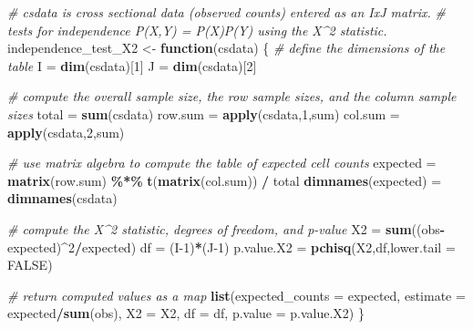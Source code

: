 \documentclass[
]{article}
\newenvironment{Shaded}{\begin{snugshade}}{\end{snugshade}}
\newcommand{\AttributeTok}[1]{\textcolor[rgb]{0.13,0.29,0.53}{#1}}
\newcommand{\CommentTok}[1]{\textcolor[rgb]{0.56,0.35,0.01}{\textit{#1}}}
\newcommand{\ConstantTok}[1]{\textcolor[rgb]{0.56,0.35,0.01}{#1}}
\newcommand{\ControlFlowTok}[1]{\textcolor[rgb]{0.13,0.29,0.53}{\textbf{#1}}}
\newcommand{\DecValTok}[1]{\textcolor[rgb]{0.00,0.00,0.81}{#1}}
\newcommand{\FunctionTok}[1]{\textcolor[rgb]{0.13,0.29,0.53}{\textbf{#1}}}
\newcommand{\NormalTok}[1]{#1}
\newcommand{\OtherTok}[1]{\textcolor[rgb]{0.56,0.35,0.01}{#1}}
\newcommand{\SpecialCharTok}[1]{\textcolor[rgb]{0.81,0.36,0.00}{\textbf{#1}}}
\begin{document}
\begin{Shaded}
\begin{Highlighting}[]
\CommentTok{\# csdata is cross sectional data (observed counts) entered as an IxJ matrix.}
\CommentTok{\# tests for independence P(X,Y) = P(X)P(Y) using the X\^{}2 statistic.}
\NormalTok{independence\_test\_X2 }\OtherTok{\textless{}{-}} \ControlFlowTok{function}\NormalTok{(csdata)}
\NormalTok{\{}
  \CommentTok{\# define the dimensions of the table}
\NormalTok{  I }\OtherTok{=} \FunctionTok{dim}\NormalTok{(csdata)[}\DecValTok{1}\NormalTok{]}
\NormalTok{  J }\OtherTok{=} \FunctionTok{dim}\NormalTok{(csdata)[}\DecValTok{2}\NormalTok{]}
  
  \CommentTok{\# compute the overall sample size, the row sample sizes, and the column sample sizes}
\NormalTok{  total }\OtherTok{=} \FunctionTok{sum}\NormalTok{(csdata)}
\NormalTok{  row.sum }\OtherTok{=} \FunctionTok{apply}\NormalTok{(csdata,}\DecValTok{1}\NormalTok{,sum)}
\NormalTok{  col.sum }\OtherTok{=} \FunctionTok{apply}\NormalTok{(csdata,}\DecValTok{2}\NormalTok{,sum)}
  
  \CommentTok{\# use matrix algebra to compute the table of expected cell counts}
\NormalTok{  expected }\OtherTok{=} \FunctionTok{matrix}\NormalTok{(row.sum) }\SpecialCharTok{\%*\%} \FunctionTok{t}\NormalTok{(}\FunctionTok{matrix}\NormalTok{(col.sum)) }\SpecialCharTok{/}\NormalTok{ total}
  \FunctionTok{dimnames}\NormalTok{(expected) }\OtherTok{=} \FunctionTok{dimnames}\NormalTok{(csdata)}
  
  \CommentTok{\# compute the X\^{}2 statistic, degrees of freedom, and p{-}value}
\NormalTok{  X2 }\OtherTok{=} \FunctionTok{sum}\NormalTok{((obs}\SpecialCharTok{{-}}\NormalTok{expected)}\SpecialCharTok{\^{}}\DecValTok{2}\SpecialCharTok{/}\NormalTok{expected)}
\NormalTok{  df }\OtherTok{=}\NormalTok{ (I}\DecValTok{{-}1}\NormalTok{)}\SpecialCharTok{*}\NormalTok{(J}\DecValTok{{-}1}\NormalTok{)}
\NormalTok{  p.value.X2 }\OtherTok{=} \FunctionTok{pchisq}\NormalTok{(X2,df,}\AttributeTok{lower.tail =} \ConstantTok{FALSE}\NormalTok{)}
  
  \CommentTok{\# return computed values as a map}
  \FunctionTok{list}\NormalTok{(}\AttributeTok{expected\_counts =}\NormalTok{ expected,}
       \AttributeTok{estimate =}\NormalTok{ expected}\SpecialCharTok{/}\FunctionTok{sum}\NormalTok{(obs),}
       \AttributeTok{X2 =}\NormalTok{ X2,}
       \AttributeTok{df =}\NormalTok{ df,}
       \AttributeTok{p.value =}\NormalTok{ p.value.X2)}
\NormalTok{\}}
\end{Highlighting}
\end{Shaded}
\end{document}
